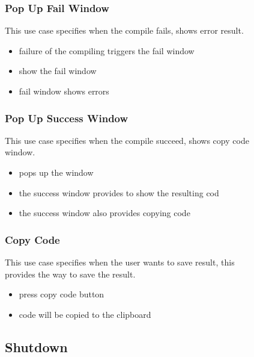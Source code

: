 \documentclass[conference]{IEEEtran}
\begin{document}
\begin{itemize}
\begin{itemize}
\begin{itemize}
\begin{itemize}
\begin{figure}[h]
\begin{enumerate}
\begin{itemize}
\begin{enumerate}
\subsubsection{Pop Up Fail Window}
This use case specifies when the compile fails, shows error result.
\begin{itemize}
  \item failure of the compiling triggers the fail window
  \item show the fail window
  \item fail window shows errors
\end{itemize}
\textit{}



\subsubsection{Pop Up Success Window}
This use case specifies when the compile succeed, shows copy code window.
\begin{itemize}
  \item pops up the window
  \item the success window provides to show the resulting cod
  \item the success window also provides copying code
\end{itemize}
\textit{}

\subsubsection{Copy Code}
This use case specifies when the user wants to save result, this provides the way to save the result.
\begin{itemize}
  \item press copy code button
  \item code will be copied to the clipboard
\end{itemize}
\textit{}


\subsection{Shutdown}


\end{enumerate}
\end{itemize}
\end{enumerate}
\end{figure}
\end{itemize}
\end{itemize}
\end{itemize}
\end{itemize}
\end{document}
